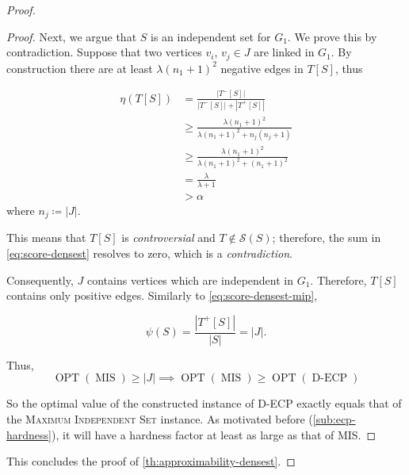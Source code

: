 \begin{proof}
\begin{proof}
		Next, we argue that $S$ is an independent set for $G_1$. We prove this by
		contradiction. Suppose
		that two vertices $v_{i} $, $v_{j} \in J$ are linked in $G_1$.
		By construction there are at least $\lambda (n_1 + 1)^{2} $ negative edges in
		$T[S]$, thus

		\begin{align*}
			\eta(T[S]) & = \frac{|T^{-}[S]|}{|T^{-}[S]| + |T^{+}[S]|}      \\
			           & \geq \frac{\lambda (n_1+1)^2}{\lambda (n_1+1)^2 +
				n_j(n_j+1)}
			\\ & \geq \frac{\lambda (n_1+1)^{2} }{\lambda (n_1+1)^2 + (n_1+1)^2}
			\\ & = \frac{\lambda }{\lambda + 1}
			\\ & > \alpha
		\end{align*}
		where $n_{j} \coloneqq |J|$.


		This means that $T[S]$ is \emph{controversial} and $T \not\in
			\mathcal{S}(S) $; therefore, the sum in \autoref{eq:score-densest} resolves to
		zero, which is a \emph{contradiction}.

		Consequently, $J$ contains vertices which are independent in $G_1$.
		Therefore, $T[S]$ contains only positive edges. Similarly to
		\autoref{eq:score-densest-mip},

		\begin{equation}
			\psi(S) = \frac{|T^{+}[S]|}{|S|} = |J|.
		\end{equation}

		Thus,
		\begin{equation}
			\operatorname{OPT}(\operatorname{MIS}) \geq |J| \implies
			\operatorname{OPT}(\operatorname{MIS}) \geq
			\operatorname{OPT}(\operatorname{D-ECP})
		\end{equation}

		So the optimal value of the constructed instance of \acrshort{D-ECP}
		exactly equals that of the \textsc{Maximum Independent Set} instance.
		As motivated before (\autoref{sub:ecp-hardness}), it will have a hardness factor at least as large as that of MIS.
	\end{proof}

	This concludes the proof of \autoref{th:approximability-densest}.
\end{proof}
